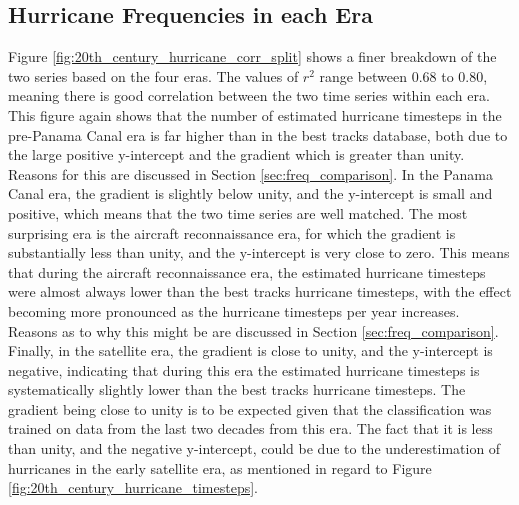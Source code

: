 \documentclass[pdftex,12pt,a4paper]{report}
\begin{document}
\subsection{Hurricane Frequencies in each Era}
\label{sec:hurr_freq_in_each_era}
Figure \ref{fig:20th_century_hurricane_corr_split} shows a finer breakdown of the two series based
on the four eras. The values of $r^2$ range between 0.68 to 0.80, meaning there is good correlation
between the two time series within each era. This figure again shows that the number of estimated
hurricane timesteps in the pre-Panama Canal era is far higher than in the best tracks database, both
due to the large positive y-intercept and the gradient which is greater than unity. Reasons for this
are discussed in Section \ref{sec:freq_comparison}. In the Panama Canal era, the gradient is
slightly below unity, and the y-intercept is small and positive, which means that the two time
series are well matched. The most surprising era is the aircraft reconnaissance era, for which the
gradient is substantially less than unity, and the y-intercept is very close to zero. This means
that during the aircraft reconnaissance era, the estimated hurricane timesteps were almost always
lower than the best tracks hurricane timesteps, with the effect becoming more pronounced as the
hurricane timesteps per year increases.  Reasons as to why this might be are discussed in Section
\ref{sec:freq_comparison}. Finally, in the satellite era, the gradient is close to unity, and the
y-intercept is negative, indicating that during this era the estimated hurricane timesteps is
systematically slightly lower than the best tracks hurricane timesteps. The gradient being close to
unity is to be expected given that the classification was trained on data from the last two decades
from this era.  The fact that it is less than unity, and the negative y-intercept, could be due to
the underestimation of hurricanes in the early satellite era, as mentioned in regard to Figure
\ref{fig:20th_century_hurricane_timesteps}.
\end{document}
